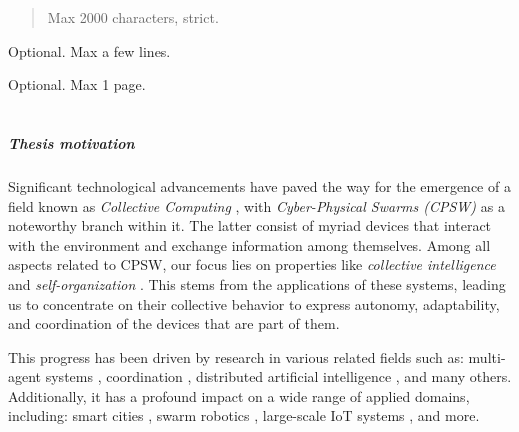 \documentclass[12pt,a4paper,openright,twoside]{book}
\begin{document}
	
\frontmatter



\begin{abstract}	
Max 2000 characters, strict.
\end{abstract}

\begin{dedication} 
Optional. Max a few lines.
\end{dedication}

\begin{acknowledgements}
Optional. Max 1 page.
\end{acknowledgements}

\tableofcontents   
\listoffigures     
\lstlistoflistings 

\mainmatter

\chapter{\introductionname}
\label{chap:introduction}


\paragraph{Thesis motivation} %

Significant technological advancements have paved the way for the emergence of a field known as \emph{Collective Computing} 
    \cite{abowd2016beyond}, with \emph{Cyber-Physical Swarms (CPSW)} \cite{schranz2021swarm} as a noteworthy branch within it.
    The latter consist of myriad devices that interact with the environment and exchange information among themselves. 
    Among all aspects related to CPSW, our focus lies on properties like \emph{collective intelligence} \cite{tumer2004survey} 
    and \emph{self-organization} \cite{schmeck2011organic}. This stems from the applications of these systems, leading us to 
    concentrate on their collective behavior to express autonomy, adaptability, and coordination of the devices 
    that are part of them.

This progress has been driven by research in various related fields such as: multi-agent systems \cite{dorri2018multi},
     coordination \cite{yang2022overview}, distributed artificial intelligence \cite{bond2014readings}, and many others. 
     Additionally, it has a profound impact on a wide range of applied domains, including: smart cities \cite{zedadra2019swarm}, 
     swarm robotics \cite{brambilla2013swarm}, large-scale IoT systems \cite{uslu2023role}, and more.
\end{document}
